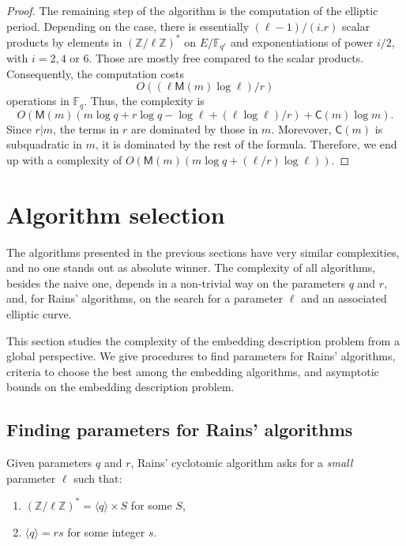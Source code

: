 \documentclass[12pt]{article}
\theoremstyle{plain}
\theoremstyle{definition}
\def\Z{\ensuremath{\mathbb{Z}}}
\def\F{\ensuremath{\mathbb{F}}}
\def\MM{\ensuremath{\mathsf{M}}}
\def\CC{\ensuremath{\mathsf{C}}}
\newcounter{algorithm}
\begin{document}
\begin{proof}
The remaining step of the algorithm is the computation of the elliptic period. 
Depending on the case, there is essentially $(\ell-1)/(i.r)$ scalar products by
elements in $(\Z/\ell\Z)^{\ast}$ on $E/\F_{q^r}$ and exponentiations of power
$i/2$, with $i=2,4$ or $6$. Those are mostly free compared to the scalar 
products. Consequently, the computation costs 
\begin{equation}
O((\ell\MM(m)\log{\ell})/r)
\end{equation}
operations in $\F_q$. Thus, the complexity is 
\begin{equation}
O(\MM(m)(m\log{q}+r\log{q}-\log{\ell}+
(\ell\log{\ell})/r)+\CC(m)\log{m}).
\end{equation}
Since $r|m$, the terms in $r$ are dominated by those in $m$. Morevover, $\CC(m)$ 
is subquadratic in $m$, it is dominated by the rest of the formula. Therefore,
we end up with a complexity of 
$O(\MM(m)(m\log{q} + (\ell/r)\log{\ell}))$.
\end{proof}

\section{Algorithm selection}
\label{sec:selection}

The algorithms presented in the previous sections have very similar
complexities, and no one stands out as absolute winner. The complexity
of all algorithms, besides the naive one, depends in a non-trivial way
on the parameters $q$ and $r$, and, for Rains' algorithms, on the
search for a parameter $\ell$ and an associated elliptic curve.

This section studies the complexity of the embedding description
problem from a global perspective. We give procedures to find
parameters for Rains' algorithms, criteria to choose the best among
the embedding algorithms, and asymptotic bounds on the embedding
description problem.


\subsection{Finding parameters for Rains' algorithms}

Given parameters $q$ and $r$, Rains' cyclotomic algorithm asks for a
\emph{small} parameter $\ell$ such that:
\begin{enumerate}
\item $(\Z/\ell\Z)^\ast = \langle q\rangle \times S$ for some $S$,
\item $\langle q \rangle = rs$ for some integer $s$.
\end{enumerate}
\end{document}
